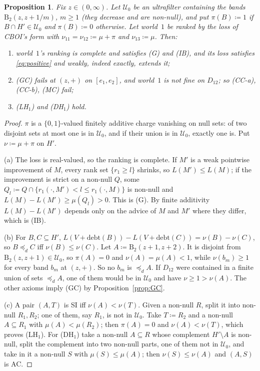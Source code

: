 \documentclass[11pt]{article}
\newtheorem{proposition}[theorem]{Proposition}
\theoremstyle{definition}\newtheorem{definition}[theorem]{Definition}
\theoremstyle{remark}\newtheorem{remark}[theorem]{Remark}
\newcommand{\debt}{\mathrm{debt}}
\newcommand{\Band}{\mathrm{B}}
\newcommand{\Uf}{\mathcal U}
\begin{document}
\begin{proposition}\label{ex:germ}
Fix $z\in(0,\infty)$. Let $\Uf_0$ be an ultrafilter containing the bands
$\Band_2(z,z+1/m)$, $m\ge1$ (they decrease and are non-null), and put
$\pi(B)\coloneqq1$ if $B\cap H'\in\Uf_0$ and $\pi(B)\coloneqq0$ otherwise.
Let world~$1$ be ranked by the loss of CBOI's form with
$\nu_{11}=\nu_{12}\coloneqq\mu+\pi$ and $\nu_{13}\coloneqq\mu$. Then:
\begin{enumerate}[label=(\alph*)]
\item world~$1$'s ranking is complete and satisfies (G) and (IB), and its
loss satisfies \eqref{eq:positive} and weakly, indeed exactly, extends it;
\item (GC) fails at $(z,+)$ on $[e_1,e_2]$, and world~$1$ is not fine on
$D_{12}$; so (CC-a), (CC-b), (MC) fail;
\item (LH$_1$) and (DH$_1$) hold.
\end{enumerate}
\end{proposition}
\begin{proof}
$\pi$ is a $\{0,1\}$-valued finitely additive charge vanishing on null sets:
of two disjoint sets at most one is in $\Uf_0$, and if their union is in
$\Uf_0$, exactly one is. Put $\nu\coloneqq\mu+\pi$ on $H'$.

(a) The loss is real-valued, so the ranking is complete. If $M'$ is a weak
pointwise improvement of $M$, every rank set $\{r_1\ge l\}$ shrinks, so
$L(M')\le L(M)$; if the improvement is strict on a non-null $Q$, some
$Q_l\coloneqq Q\cap\{r_1(\cdot,M')<l\le r_1(\cdot,M)\}$ is non-null and
$L(M)-L(M')\ge\mu(Q_l)>0$. This is (G). By finite additivity
$L(M)-L(M')$ depends only on the advice of $M$ and $M'$ where they differ,
which is (IB).

(b) For $B,C\subseteq H'$, $L(V+\debt(B))-L(V+\debt(C))=\nu(B)-\nu(C)$, so
$B\preceq_dC$ iff $\nu(B)\le\nu(C)$. Let $A\coloneqq\Band_2(z+1,z+2)$. It is
disjoint from $\Band_2(z,z+1)\in\Uf_0$, so $\pi(A)=0$ and $\nu(A)=\mu(A)<1$,
while $\nu(b_m)\ge1$ for every band $b_m$ at $(z,+)$. So no $b_m$ is
$\preceq_dA$. If $D_{12}$ were contained in a finite union of sets
$\preceq_dA$, one of them
would be in $\Uf_0$ and have $\nu\ge1>\nu(A)$. The other axioms imply (GC)
by Proposition~\ref{prop:GC}.

(c) A pair $(A,T)$ is SI iff $\nu(A)<\nu(T)$. Given a non-null $R$, split it
into non-null $R_1,R_2$; one of them, say $R_1$, is not in $\Uf_0$. Take
$T\coloneqq R_2$ and a non-null $A\subseteq R_1$ with $\mu(A)<\mu(R_2)$; then
$\pi(A)=0$ and $\nu(A)<\nu(T)$, which proves (LH$_1$). For (DH$_1$) take a
non-null $A\subseteq R$ whose complement $H'\setminus A$ is non-null, split the
complement into two non-null parts, one of them not in $\Uf_0$, and take in it
a non-null $S$ with $\mu(S)\le\mu(A)$; then $\nu(S)\le\nu(A)$ and $(A,S)$ is
AC.
\end{proof}
\end{document}
